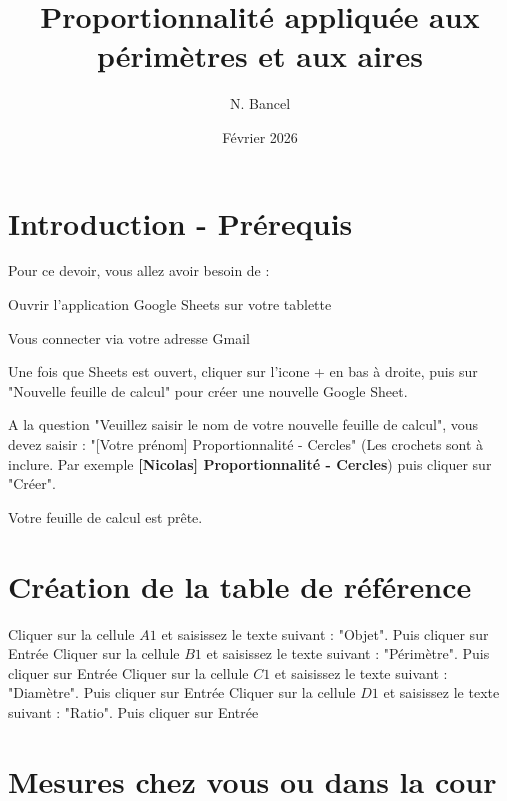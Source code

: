 \documentclass{exam}
\title{Proportionnalité appliquée aux périmètres et aux aires}
\author{N. Bancel}
\date{Février 2026}
\begin{document}
{\let\newpage\relax\maketitle}

\section{Introduction - Prérequis}

\begin{Indication}
  Pour ce devoir, vous allez avoir besoin de : 
  \begin{compactitem}
    \item Ouvrir l'application Google Sheets sur votre tablette
    \item Vous connecter via votre adresse Gmail
    \item Une fois que Sheets est ouvert, cliquer sur l'icone + en bas à droite, puis sur "Nouvelle feuille de calcul" pour créer une nouvelle Google Sheet.
    \item A la question "Veuillez saisir le nom de votre nouvelle feuille de calcul", vous devez saisir : "[Votre prénom] Proportionnalité - Cercles" (Les crochets sont à inclure. Par exemple \textbf{[Nicolas] Proportionnalité - Cercles}) puis cliquer sur "Créer".
  \end{compactitem}

  Votre feuille de calcul est prête.
\end{Indication}

\section{Création de la table de référence}

\begin{questions}
  \question Cliquer sur la cellule $A1$ et saisissez le texte suivant : "Objet". Puis cliquer sur Entrée
  \question Cliquer sur la cellule $B1$ et saisissez le texte suivant : "Périmètre". Puis cliquer sur Entrée
  \question Cliquer sur la cellule $C1$ et saisissez le texte suivant : "Diamètre". Puis cliquer sur Entrée
  \question Cliquer sur la cellule $D1$ et saisissez le texte suivant : "Ratio". Puis cliquer sur Entrée
\end{questions}

\section{Mesures chez vous ou dans la cour}
\end{document}
